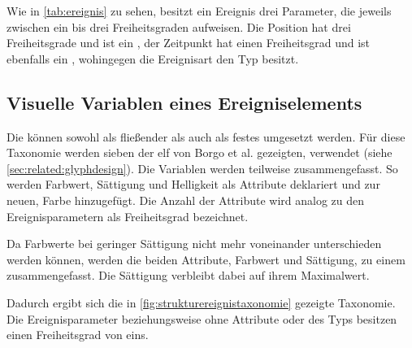 Wie in \autoref{tab:ereignis} zu sehen, besitzt ein Ereignis drei Parameter, die jeweils zwischen ein bis drei Freiheitsgraden aufweisen. Die Position hat drei Freiheitsgrade und ist ein , der Zeitpunkt hat einen Freiheitsgrad und ist ebenfalls ein , wohingegen die Ereignisart den Typ  besitzt.

\subsection*{Visuelle Variablen eines Ereigniselements}\label{sec:strukturereignistaxonomie:variablen}
Die  können sowohl als fließender  als auch als festes  umgesetzt werden. Für diese Taxonomie werden sieben der elf von Borgo et al. gezeigten,  verwendet (siehe \autoref{sec:related:glyphdesign}). Die Variablen werden teilweise zusammengefasst. So werden Farbwert, Sättigung und Helligkeit als Attribute deklariert und zur neuen,  Farbe hinzugefügt. Die Anzahl der Attribute wird analog zu den Ereignisparametern als Freiheitsgrad bezeichnet.

Da Farbwerte bei geringer Sättigung nicht mehr voneinander unterschieden werden können, werden die beiden Attribute, Farbwert und Sättigung, zu einem zusammengefasst. Die Sättigung verbleibt dabei auf ihrem Maximalwert.

Dadurch ergibt sich die in \autoref{fig:strukturereignistaxonomie} gezeigte Taxonomie. Die Ereignisparameter beziehungsweise  ohne Attribute oder des Typs  besitzen einen Freiheitsgrad von eins.


